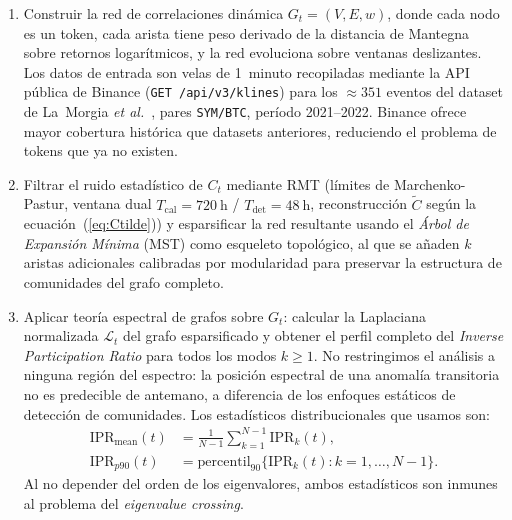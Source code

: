 \begin{enumerate}

  \item Construir la red de correlaciones dinámica $G_t = (V, E, w)$,
        donde cada nodo es un token, cada arista tiene peso derivado de
        la distancia de Mantegna~\cite{mantegna1999} sobre retornos
        logarítmicos, y la red evoluciona sobre ventanas deslizantes.
        Los datos de entrada son velas de 1~minuto recopiladas mediante
        la API pública de Binance (\texttt{GET /api/v3/klines}) para los
        ${\approx}351$ eventos del dataset de La~Morgia
        \textit{et al.}~\cite{lamorgia2020}, pares \texttt{SYM/BTC},
        período 2021--2022. Binance ofrece mayor cobertura histórica que
        datasets anteriores, reduciendo el problema de tokens que ya no
        existen.

  \item Filtrar el ruido estadístico de $C_t$ mediante RMT (límites de
        Marchenko-Pastur, ventana dual $T_{\text{cal}} = 720~\text{h}$ /
        $T_{\text{det}} = 48~\text{h}$, reconstrucción $\tilde{C}$ según
        la ecuación~(\ref{eq:Ctilde})) y esparsificar la red resultante
        usando el \emph{Árbol de Expansión Mínima} (MST) como esqueleto
        topológico, al que se añaden $k$ aristas adicionales calibradas
        por modularidad para preservar la estructura de comunidades del
        grafo completo.

  \item Aplicar teoría espectral de grafos sobre $G_t$: calcular la
        Laplaciana normalizada $\mathcal{L}_t$ del grafo esparsificado y
        obtener el perfil completo del \emph{Inverse Participation Ratio}
        para todos los modos $k \geq 1$. No restringimos el análisis a
        ninguna región del espectro: la posición espectral de una anomalía
        transitoria no es predecible de antemano, a diferencia de los
        enfoques estáticos de detección de comunidades. Los estadísticos
        distribucionales que usamos son:
        \begin{align*}
          \mathrm{IPR}_{\text{mean}}(t) &= \frac{1}{N-1}
            \sum_{k=1}^{N-1} \mathrm{IPR}_k(t), \\[3pt]
          \mathrm{IPR}_{p90}(t) &= \mathrm{percentil}_{90}
            \bigl\{\mathrm{IPR}_k(t) : k = 1, \ldots, N-1\bigr\}.
        \end{align*}
        Al no depender del orden de los eigenvalores, ambos estadísticos son
        inmunes al problema del \emph{eigenvalue crossing}.


\end{enumerate}
